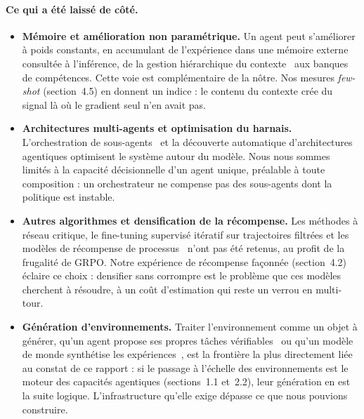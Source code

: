 \documentclass[11pt,a4paper]{article}
\begin{document}
\paragraph{Ce qui a été laissé de côté.}
\begin{itemize}
    \item \textbf{Mémoire et amélioration non paramétrique.} Un agent peut s'améliorer à poids constants, en accumulant de l'expérience dans une mémoire externe consultée à l'inférence, de la gestion hiérarchique du contexte~\cite{packer_memgpt_2023} aux banques de compétences. Cette voie est complémentaire de la nôtre. Nos mesures \emph{few-shot} (section~4.5) en donnent un indice : le contenu du contexte crée du signal là où le gradient seul n'en avait pas.
    \item \textbf{Architectures multi-agents et optimisation du harnais.} L'orchestration de sous-agents~\cite{kimi_k25_2026} et la découverte automatique d'architectures agentiques optimisent le système autour du modèle. Nous nous sommes limités à la capacité décisionnelle d'un agent unique, préalable à toute composition : un orchestrateur ne compense pas des sous-agents dont la politique est instable.
    \item \textbf{Autres algorithmes et densification de la récompense.} Les méthodes à réseau critique, le fine-tuning supervisé itératif sur trajectoires filtrées et les modèles de récompense de processus~\cite{lightman2023verify} n'ont pas été retenus, au profit de la frugalité de GRPO. Notre expérience de récompense façonnée (section~4.2) éclaire ce choix : densifier sans corrompre est le problème que ces modèles cherchent à résoudre, à un coût d'estimation qui reste un verrou en multi-tour.
    \item \textbf{Génération d'environnements.} Traiter l'environnement comme un objet à générer, qu'un agent propose ses propres tâches vérifiables~\cite{zhou2025sca} ou qu'un modèle de monde synthétise les expériences~\cite{dreamgym2025}, est la frontière la plus directement liée au constat de ce rapport : si le passage à l'échelle des environnements est le moteur des capacités agentiques (sections~1.1 et~2.2), leur génération en est la suite logique. L'infrastructure qu'elle exige dépasse ce que nous pouvions construire.
\end{itemize}
\end{document}
